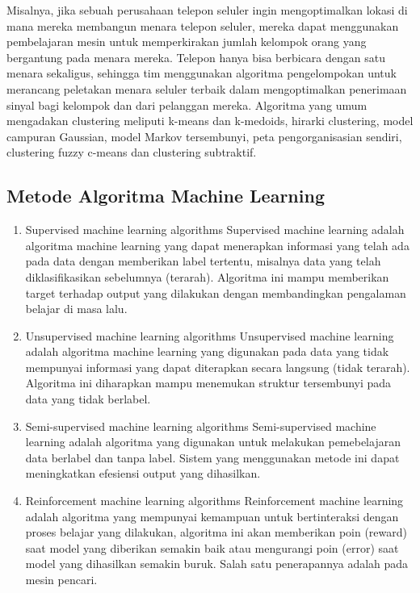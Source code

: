 \begin{itemize}
Misalnya, jika sebuah perusahaan telepon seluler ingin mengoptimalkan lokasi di mana mereka membangun menara telepon seluler, mereka dapat menggunakan pembelajaran mesin untuk memperkirakan jumlah kelompok orang yang bergantung pada menara mereka. Telepon hanya bisa berbicara dengan satu menara sekaligus, sehingga tim menggunakan algoritma pengelompokan untuk merancang peletakan menara seluler terbaik dalam mengoptimalkan penerimaan sinyal bagi kelompok dan dari pelanggan mereka.
Algoritma yang umum mengadakan clustering meliputi k-means dan k-medoids, hirarki clustering, model campuran Gaussian, model Markov tersembunyi, peta pengorganisasian sendiri, clustering fuzzy c-means dan clustering subtraktif.
\end{itemize}
\subsection {Metode Algoritma Machine Learning} 
\begin{enumerate}
\item Supervised machine learning algorithms
Supervised machine learning adalah algoritma machine learning yang dapat menerapkan informasi yang telah ada pada data dengan memberikan label tertentu, misalnya data yang telah diklasifikasikan sebelumnya (terarah). Algoritma ini mampu memberikan target terhadap output yang dilakukan dengan membandingkan pengalaman belajar di masa lalu.
\item Unsupervised machine learning algorithms
Unsupervised machine learning adalah algoritma machine learning yang digunakan pada data yang tidak mempunyai informasi yang dapat diterapkan secara langsung (tidak terarah). Algoritma ini diharapkan mampu menemukan struktur tersembunyi pada data yang tidak berlabel.
\item Semi-supervised machine learning algorithms
Semi-supervised machine learning adalah algoritma yang digunakan untuk melakukan pemebelajaran data berlabel dan tanpa label. Sistem yang menggunakan metode ini dapat meningkatkan efesiensi output yang dihasilkan.
\item Reinforcement machine learning algorithms
Reinforcement machine learning adalah algoritma yang mempunyai kemampuan untuk bertinteraksi dengan proses belajar yang dilakukan, algoritma ini akan memberikan poin (reward) saat model yang diberikan semakin baik atau mengurangi poin (error) saat model yang dihasilkan semakin buruk. Salah satu penerapannya adalah pada mesin pencari.
\end{enumerate}

